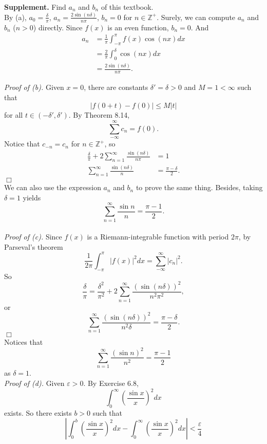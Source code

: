 \documentclass{article}
\begin{document}
\textbf{Supplement.} Find $a_n$ and $b_n$ of this textbook. \\
By (a), $a_0 = \frac{\delta}{\pi}$,
$a_n = \frac{2 \sin(n \delta)}{n \pi}$, $b_n = 0$ for $n \in \mathbb{Z}^+$.
Surely, we can compute $a_n$ and $b_n$ ($n > 0$) directly.
Since $f(x)$ is an even function, $b_n = 0$.
And
\begin{align*}
a_n
&= \frac{1}{\pi} \int_{-\pi}^\pi f(x) \cos(nx) dx \\
&= \frac{2}{\pi} \int_{0}^\delta \cos(nx) dx \\
&= \frac{2 \sin(n \delta)}{n \pi}.
\end{align*}

\emph{Proof of (b).}
Given $x = 0$, there are constants $\delta' = \delta > 0$ and $M = 1 < \infty$ such that
$$|f(0 + t) - f(0)| \leq M|t|$$ for all $t \in (-\delta', \delta')$.
By Theorem 8.14,
$$\sum_{-\infty}^{\infty} c_n = f(0).$$
Notice that $c_{-n} = c_n$ for $n \in \mathbb{Z}^+$, so
\begin{align*}
\frac{\delta}{\pi} + 2 \sum_{n = 1}^{\infty} \frac{\sin(n \delta)}{n \pi}
&= 1 \\
\sum_{n = 1}^{\infty} \frac{\sin(n \delta)}{n}
&= \frac{\pi - \delta}{2}.
\end{align*}
$\Box$ \\

We can also use the expression $a_n$ and $b_n$ to prove the same thing.
Besides, taking $\delta = 1$ yields
$$\sum_{n = 1}^{\infty} \frac{\sin n}{n} = \frac{\pi - 1}{2}.$$ \\

\emph{Proof of (c).}
Since $f(x)$ is a Riemann-integrable function with period $2 \pi$,
by Parseval's theorem
$$\frac{1}{2 \pi} \int_{-\pi}^\pi |f(x)|^2 dx = \sum_{-\infty}^{\infty} |c_n|^2.$$
So
$$\frac{\delta}{\pi}
= \frac{\delta^2}{\pi^2} + 2 \sum_{n = 1}^{\infty} \frac{(\sin(n\delta))^2}{n^2 \pi^2}, $$
or
$$\sum_{n = 1}^{\infty} \frac{(\sin(n\delta))^2}{n^2 \delta}
= \frac{\pi - \delta}{2}.$$
$\Box$ \\

Notices that
$$\sum_{n = 1}^{\infty} \frac{(\sin n)^2}{n^2} = \frac{\pi - 1}{2}$$
as $\delta = 1$. \\

\emph{Proof of (d).}
Given $\varepsilon > 0$.
By Exercise 6.8,
$$\int_{0}^{\infty} \left( \frac{\sin x}{x} \right)^2 dx$$ exists.
So there exists $b > 0$ such that
$$\left| \int_{0}^{b} \left( \frac{\sin x}{x} \right)^2 dx
- \int_{0}^{\infty} \left( \frac{\sin x}{x} \right)^2 dx
\right| < \frac{\varepsilon}{4}$$
\end{document}
